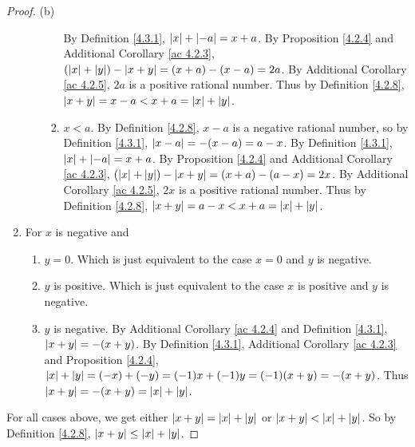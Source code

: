 \begin{proof}{(b)}
\begin{enumerate}[label=(\Roman*)]
\begin{enumerate}[label=(\roman*)]
\begin{enumerate}[label=(\arabic*)]
            By Definition \ref{4.3.1}, \(\abs*{x} + \abs*{-a} = x + a\).
            By Proposition \ref{4.2.4} and Additional Corollary \ref{ac 4.2.3}, \((\abs*{x} + \abs*{y}) - \abs*{x + y} = (x + a) - (x - a) = 2a\).
            By Additional Corollary \ref{ac 4.2.5}, \(2a\) is a positive rational number.
            Thus by Definition \ref{4.2.8}, \(\abs*{x + y} = x - a < x + a = \abs*{x} + \abs*{y}\).
            \item \(x < a\).
            By Definition \ref{4.2.8}, \(x - a\) is a negative rational number, so by Definition \ref{4.3.1}, \(\abs*{x - a} = -(x - a) = a - x\).
            By Definition \ref{4.3.1}, \(\abs*{x} + \abs*{-a} = x + a\).
            By Proposition \ref{4.2.4} and Additional Corollary \ref{ac 4.2.3}, \((\abs*{x} + \abs*{y}) - \abs*{x + y} = (x + a) - (a - x) = 2x\).
            By Additional Corollary \ref{ac 4.2.5}, \(2x\) is a positive rational number.
            Thus by Definition \ref{4.2.8}, \(\abs*{x + y} = a - x < x + a = \abs*{x} + \abs*{y}\).
        \end{enumerate}
    \end{enumerate}
    \item For \(x\) is negative and
    \begin{enumerate}[label=(\roman*)]
        \item \(y = 0\).
        Which is just equivalent to the case \(x = 0\) and \(y\) is negative.
        \item \(y\) is positive.
        Which is just equivalent to the case \(x\) is positive and \(y\) is negative.
        \item \(y\) is negative.
        By Additional Corollary \ref{ac 4.2.4} and Definition \ref{4.3.1}, \(\abs*{x + y} = -(x + y)\).
        By Definition \ref{4.3.1}, Additional Corollary \ref{ac 4.2.3} and Proposition \ref{4.2.4}, \(\abs*{x} + \abs*{y} = (-x) + (-y) = (-1)x + (-1)y = (-1)(x + y) = -(x + y)\).
        Thus \(\abs*{x + y} = -(x + y) = \abs*{x} + \abs*{y}\).
    \end{enumerate}
\end{enumerate}
For all cases above, we get either \(\abs*{x + y} = \abs*{x} + \abs*{y}\) or \(\abs*{x + y} < \abs*{x} + \abs*{y}\).
So by Definition \ref{4.2.8}, \(\abs*{x + y} \leq \abs*{x} + \abs*{y}\).
\end{proof}

